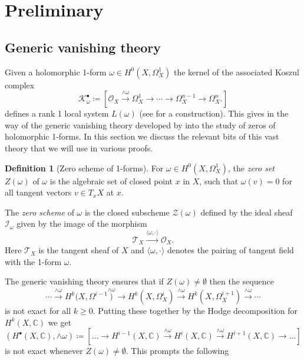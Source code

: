 \documentclass[11pt,reqno]{amsart}
\theoremstyle{definition}
\newtheorem{definition}[theorem]{Definition}
\theoremstyle{remark}
\theoremstyle{cited}
\theoremstyle{citeddef}
\newcommand{\C}{\mathbb{C}}
\newcommand{\sK}{\mathcal{K}}
\newcommand{\sO}{\mathcal{O}}
\newcommand{\sZ}{\mathcal{Z}}
\newcommand{\bbC}{\mathbb{C}}
\begin{document}
\section{Preliminary}
\subsection{Generic vanishing theory}
Given a holomorphic 1-form $\omega\in H^0(X,\Omega_X^1)$
the kernel of the associated Koszul complex
\begin{equation}
\sK^{\bullet}_{\omega} \coloneqq [\sO_X\overset{\wedge\omega}{\to} \Omega_X^1 \to \cdots\to \Omega_X^{n-1}\to \Omega^n_X.]
\label{eq:koszul}
\end{equation}
defines a rank 1 local system $L(\omega)$ (see \cite[\S 2.1]{sch}
for a construction). This gives in the way of the generic vanishing theory developed by \cite{GL, Ara, Sim} into the 
study of zeros of holomorphic 1-forms. In this section we discuss 
the relevant bits of this vast theory that we will use in various
proofs.

\begin{definition}[Zero scheme of 1-forms]\label{def:zeroscheme}
For $\omega\in H^0(X, \Omega_X^1)$, the \emph{zero set} $Z(\omega)$ of $\omega$ is the algebraic set of closed point $x$ in $X$, such that $\omega(v)=0$
for all tangent vectors $v\in T_xX$ at $x$. 

The \emph{zero scheme} of $\omega$ is the closed subscheme $\sZ(\omega)$ defined by the ideal sheaf $\mathcal{I}_{\omega}$ given by the image of the morphism 
\[\mathcal{T}_X\overset{\langle\omega, \cdot\rangle}{\longrightarrow} \mathcal{O}_X.\] 
Here $\mathcal{T}_X$ is the tangent sheaf of $X$ and $\langle\omega, \cdot\rangle$ denotes the pairing of tangent field with 
the 1-form $\omega$.
\end{definition}

 
The generic vanishing theory 
\cite[Proposition 3.4]{GL} ensures that
if $Z(\omega)\neq \emptyset$ then the sequence
\[\cdots\overset{\wedge\omega}{\to} H^k(X, \Omega^{i-1}
\overset{\wedge\omega}){\to}H^k(X, \Omega_X^{i})
\overset{\wedge\omega}{\to} H^k(X,\Omega_X^{i+1})
\overset{\wedge\omega}{\to}\cdots\]
is not exact for all $k\geq 0$. Putting these together 
by the Hodge decomposition for $H^k(X,\bbC)$ we get
\begin{equation}
(H^{\bullet}(X,\bbC), \wedge\omega)\coloneqq [\ldots\to H^{i-1}(X,\C)\overset{\wedge\omega}{\longrightarrow}H^{i}(X,\C)\overset{\wedge\omega}{\longrightarrow}H^{i+1}(X,\C)\to\ldots]
\label{eq:resonance}
\end{equation}
is not exact whenever $Z(\omega)\neq \emptyset$. This prompts the following
\end{document}

